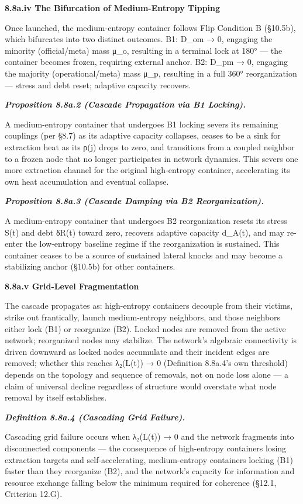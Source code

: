 \documentclass[
]{article}
\begin{document}
\textbf{8.8a.iv The Bifurcation of Medium-Entropy Tipping}

Once launched, the medium-entropy container follows Flip Condition B
(§10.5b), which bifurcates into two distinct outcomes. B1: D\_om → 0,
engaging the minority (official/meta) mass μ\_o, resulting in a terminal
lock at 180° --- the container becomes frozen, requiring external
anchor. B2: D\_pm → 0, engaging the majority (operational/meta) mass
μ\_p, resulting in a full 360° reorganization --- stress and debt reset;
adaptive capacity recovers.

\emph{\textbf{Proposition 8.8a.2 (Cascade Propagation via B1 Locking).}}

A medium-entropy container that undergoes B1 locking severs its
remaining couplings (per §8.7) as its adaptive capacity collapses,
ceases to be a sink for extraction heat as its ρ(j) drops to zero, and
transitions from a coupled neighbor to a frozen node that no longer
participates in network dynamics. This severs one more extraction
channel for the original high-entropy container, accelerating its own
heat accumulation and eventual collapse.

\emph{\textbf{Proposition 8.8a.3 (Cascade Damping via B2
Reorganization).}}

A medium-entropy container that undergoes B2 reorganization resets its
stress S(t) and debt δR(t) toward zero, recovers adaptive capacity
d\_A(t), and may re-enter the low-entropy baseline regime if the
reorganization is sustained. This container ceases to be a source of
sustained lateral knocks and may become a stabilizing anchor (§10.5b)
for other containers.

\textbf{8.8a.v Grid-Level Fragmentation}

The cascade propagates as: high-entropy containers decouple from their
victims, strike out frantically, launch medium-entropy neighbors, and
those neighbors either lock (B1) or reorganize (B2). Locked nodes are
removed from the active network; reorganized nodes may stabilize. The
network's algebraic connectivity is driven downward as locked nodes
accumulate and their incident edges are removed; whether this reaches
λ₂(L(t)) → 0 (Definition 8.8a.4's own threshold) depends on the topology
and sequence of removals, not on node loss alone --- a claim of
universal decline regardless of structure would overstate what node
removal by itself establishes.

\emph{\textbf{Definition 8.8a.4 (Cascading Grid Failure).}}

Cascading grid failure occurs when λ₂(L(t)) → 0 and the network
fragments into disconnected components --- the consequence of
high-entropy containers losing extraction targets and self-accelerating,
medium-entropy containers locking (B1) faster than they reorganize (B2),
and the network's capacity for information and resource exchange falling
below the minimum required for coherence (§12.1, Criterion 12.G).
\end{document}
